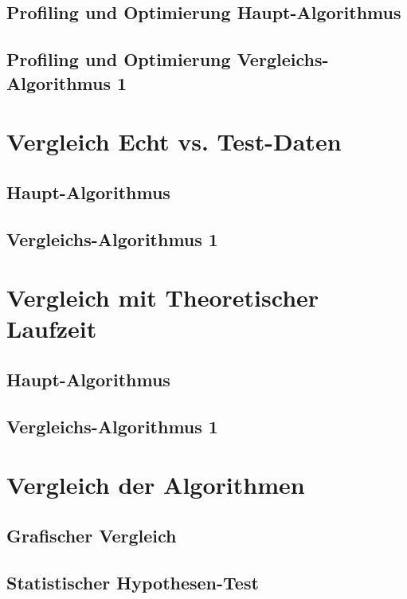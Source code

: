 \documentclass[
10pt, %
a4paper, %
oneside, %
headinclude,footinclude, %
BCOR5mm, %
]{scrartcl}
\begin{document}
\subsection{Profiling und Optimierung Haupt-Algorithmus}
\subsection{Profiling und Optimierung Vergleichs-Algorithmus 1}
\section{Vergleich Echt vs. Test-Daten}
\subsection{Haupt-Algorithmus}
\subsection{Vergleichs-Algorithmus 1}
\section{Vergleich mit Theoretischer Laufzeit}
\subsection{Haupt-Algorithmus}
\subsection{Vergleichs-Algorithmus 1}
\section{Vergleich der Algorithmen}
\subsection{Grafischer Vergleich}
\subsection{Statistischer Hypothesen-Test}



\renewcommand{\refname}{\spacedlowsmallcaps{References}} %




\end{document}
